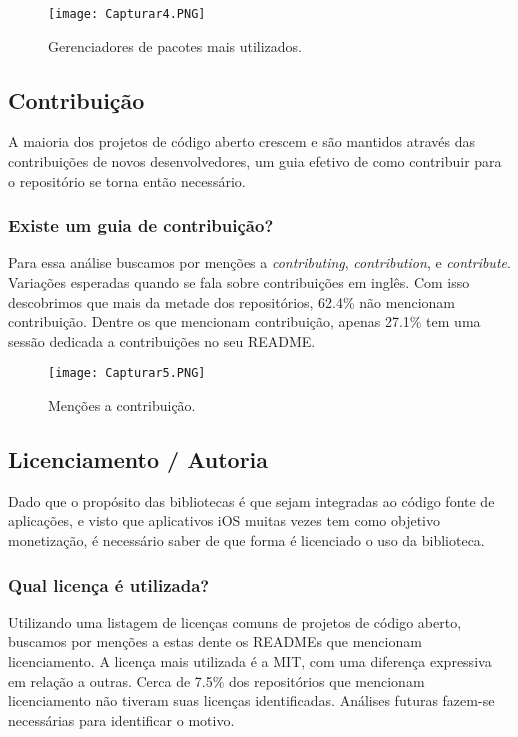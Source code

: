 \documentclass[preprint,12pt,authoryear]{elsarticle}
\begin{document}
\begin{figure}[!htb]
\centering
\texttt{[image: Capturar4.PNG]}
\caption{Gerenciadores de pacotes mais utilizados.}
\end{figure}


\subsection{Contribuição}
A maioria dos projetos de código aberto crescem e são mantidos através das contribuições de novos desenvolvedores, um guia efetivo de como contribuir para o repositório se torna então necessário.

\subsubsection{Existe um guia de contribuição?}
Para essa análise buscamos por menções a \textit{contributing}, \textit{contribution}, e \textit{contribute}. Variações esperadas quando se fala sobre contribuições em inglês. Com isso descobrimos que mais da metade dos repositórios, 62.4\%  não mencionam contribuição. Dentre os que mencionam contribuição, apenas 27.1\% tem uma sessão dedicada a contribuições no seu README.

\begin{figure}[!htb]
\centering
\texttt{[image: Capturar5.PNG]}
\caption{Menções a contribuição.}
\end{figure}


\subsection{Licenciamento / Autoria}
Dado que o propósito das bibliotecas é que sejam integradas ao código fonte de aplicações, e visto que aplicativos iOS muitas vezes tem como objetivo monetização, é necessário saber de que forma é licenciado o uso da biblioteca.

\subsubsection{Qual licença é utilizada?}
Utilizando uma listagem de licenças comuns de projetos de código aberto, buscamos por menções a estas dente os READMEs que mencionam licenciamento. A licença mais utilizada é a MIT, com uma diferença expressiva em relação a outras. Cerca de 7.5\% dos repositórios que mencionam licenciamento não tiveram suas licenças identificadas. Análises futuras fazem-se necessárias para identificar o motivo.
\end{document}
